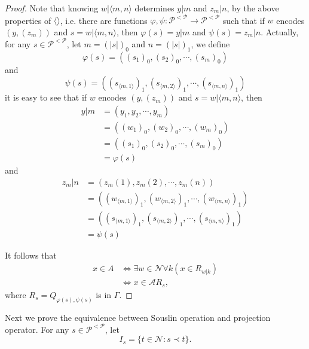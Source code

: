 \begin{proof}
Note that knowing $w|\langle m,n \rangle$ determines $y|m$ and $z_m|n$, 
by the above properties of $\langle\rangle$, i.e. there are functions 
$\varphi,\psi: \mathcal{P}^{<\mathcal{P}} \to \mathcal{P}^{<\mathcal{P}}$ 
such that if $w$ encodes $(y,(z_m))$ and $s=w|\langle m,n\rangle$, then
$\varphi(s)=y|m$ and $\psi(s)=z_m|n$. 
Actually, for any $s\in \mathcal{P}^{<\mathcal{P}}$, let $m=(|s|)_0$ and 
$n=(|s|)_1$, we define
\[
  \varphi(s)=((s_1)_0, (s_2)_0, \cdots, (s_m)_0)
\]
and
\[
  \psi(s)= ((s_{\langle m,1\rangle})_1, (s_{\langle m,2\rangle})_1, \cdots,
            (s_{\langle m,n\rangle})_1)
\]
it is easy to see that if $w$ encodes $(y,(z_m))$ and $s=w|\langle m,n\rangle$, 
then
\begin{align*}
  y|m &= (y_1, y_2, \cdots, y_m) \\
      &=((w_1)_0, (w_2)_0, \cdots, (w_m)_0) \\
      &=((s_1)_0, (s_2)_0, \cdots, (s_m)_0) \\
      &= \varphi(s)
\end{align*}
and
\begin{align*}
  z_m|n &= (z_m(1), z_m(2), \cdots, z_m(n)) \\
        &= ((w_{\langle m,1\rangle})_1, (w_{\langle m,2\rangle})_1, \cdots,
            (w_{\langle m,n\rangle})_1)  \\
        &= ((s_{\langle m,1\rangle})_1, (s_{\langle m,2\rangle})_1, \cdots,
            (s_{\langle m,n\rangle})_1)  \\
        &= \psi(s)
\end{align*}

It follows that
\begin{align*}
  x\in A 
    & \iff \exists w\in\mathcal{N} \forall k (x\in R_{w|k}) \\
    & \iff x\in \mathcal{A} R_s,
\end{align*}
where $R_s=Q_{\varphi(s),\psi(s)}$ is in $\Gamma$.
\end{proof}

Next we prove the equivalence between Souslin operation and projection operator.
For any $s\in\mathcal{P}^{<\mathcal{P}}$, let
\[
  I_s = \{ t\in\mathcal{N}: s\prec t \}.
\]

